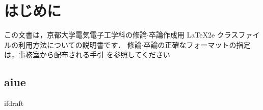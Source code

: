 \documentclass{../kuee}
\begin{document}
\fi

\chapter{はじめに}
\label{chap:intro}
この文書は，京都大学電気電子工学科の修論$\cdot$卒論作成用 \LaTeX2e{}
クラスファイルの利用方法についての説明書です．
%
修論$\cdot$卒論の正確なフォーマットの指定は，事務室から配布される手引
を参照してください

\section{aiue}

\expandafter\ifx\csname ifdraft\endcsname\relax
  
\end{document}
